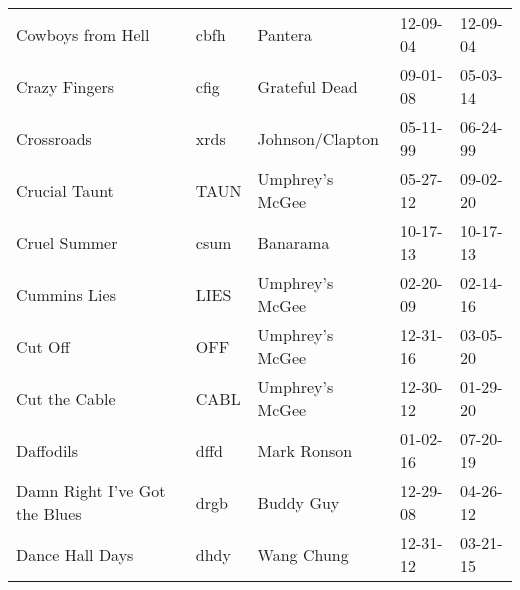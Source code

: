 \begin{longtable}{p{}p{}p{}p{}p{}}
                                                       Cowboys from Hell &          cbfh &                                                  Pantera &              12-09-04 &             12-09-04 \\
                                                           Crazy Fingers &          cfig &                                            Grateful Dead &              09-01-08 &             05-03-14 \\
                                                              Crossroads &          xrds &                                          Johnson/Clapton &              05-11-99 &             06-24-99 \\
                                                           Crucial Taunt &          TAUN &                                          Umphrey's McGee &              05-27-12 &             09-02-20 \\
                                                            Cruel Summer &          csum &                                                 Banarama &              10-17-13 &             10-17-13 \\
                                                            Cummins Lies &          LIES &                                          Umphrey's McGee &              02-20-09 &             02-14-16 \\
                                                                 Cut Off &           OFF &                                          Umphrey's McGee &              12-31-16 &             03-05-20 \\
                                                           Cut the Cable &          CABL &                                          Umphrey's McGee &              12-30-12 &             01-29-20 \\
                                                               Daffodils &          dffd &                                              Mark Ronson &              01-02-16 &             07-20-19 \\
                                           Damn Right I've Got the Blues &          drgb &                                                Buddy Guy &              12-29-08 &             04-26-12 \\
                                                         Dance Hall Days &          dhdy &                                               Wang Chung &              12-31-12 &             03-21-15 \\

\end{longtable}
